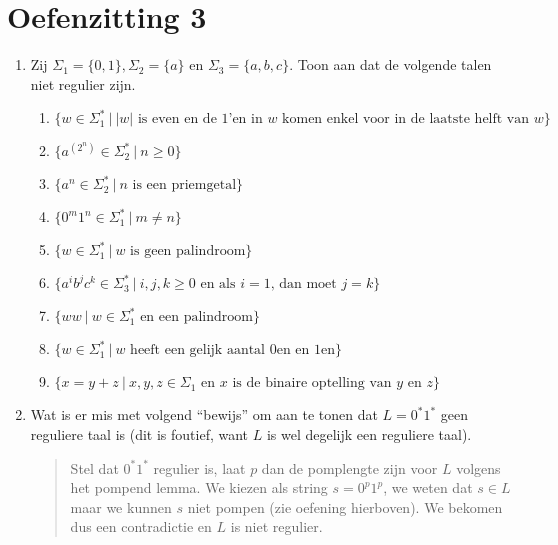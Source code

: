 \documentclass[a4paper]{article}
\begin{document}
\pagestyle{empty}
\section*{Oefenzitting 3}

\begin{enumerate}
\item Zij $\Sigma_1 = \{0,1\}, \Sigma_2 = \{a\}$ en $\Sigma_3 = \{a,b,c\}$. Toon aan dat de volgende talen niet regulier
zijn.
      \begin{enumerate}
         \item $\{ w \in \Sigma_1^*\ |\ \mbox{$\left|w\right|$ is even en de $1$'en in $w$ komen enkel voor in de
laatste helft van $w$}\}$
         \item $\{ a^{\left( 2^n \right) } \in \Sigma_2^* \ | \ n \geq 0 \}$
         \item $\{ a^n \in \Sigma_2^*\ | \ \mbox{$n$ is een priemgetal} \}$
         \item $\{ 0^m1^n \in \Sigma_1^* \ | \ m \neq n \}$
         \item $\{ w \in \Sigma_1^* \ | \ \mbox{$w$ is geen palindroom} \}$
         \item $\{ a^ib^jc^k \in \Sigma_3^* \ | \ \mbox{$i,j,k \geq 0$ en als $i = 1$, dan moet $j=k$} \}$
         \item $\{ ww \ | \ \mbox{$w\in\Sigma_1^*$ en een palindroom} \}$
         \item $\{ w\in\Sigma_1^* \ | \ \mbox{$w$ heeft een gelijk aantal 0en en 1en} \}$
         \item $\{ x=y+z \ | \ \mbox{$x,y,z\in\Sigma_1$ en $x$ is de binaire optelling van $y$ en $z$} \}$
      \end{enumerate}
   \item Wat is er mis met volgend ``bewijs'' om aan te tonen dat $L=0^*1^*$ geen reguliere taal is (dit is foutief,
want $L$ is wel degelijk een reguliere taal).
\begin{quote}
Stel dat $0^*1^*$ regulier is, laat $p$ dan de pomplengte zijn voor $L$ volgens het pompend lemma. We kiezen als string
$s=0^p1^p$, we weten dat $s\in L$ maar we kunnen $s$ niet pompen (zie oefening hierboven). We bekomen dus een
contradictie en $L$ is niet regulier.
\end{quote}


\end{enumerate}
\end{document}
